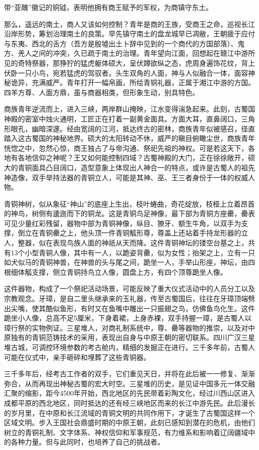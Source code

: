 带“亚醜”徽记的铜钺，表明他拥有商王赋予的军权，为商镇守东土。

那么，遥远的南土，商人又该如何控制？青年是商的王族，受商王之命，巡视长江沿岸形势，筹划治理南土的良策。早先镇守南土的盘龙城早已凋敝，王朝疲于应付与东夷、西北的舌方（吾方是殷墟出土卜辞中见到的一个商代的方国部落）、鬼方、羌人之间的冲突，久已疏于南土的治理。青年望向江面，回想起在赣江中游所见的奇特祭器，那狰狞的猛虎躯体硕大，呈伏蹲欲纵之态，虎周身遍饰花纹，背上伏卧一只小鸟，宛若猛虎的驾驭者。头生双角的人面，神与人似融合一体，面容神秘诡异，充满威严。青年打开一幅帛画，所绘青铜礼器，正属于湘江中游的方国。四羊方尊、人面方鼎，虽与商器相类，但形象生动，别具特色。

商族青年逆流而上，进入三峡，两岸群山掩映，江水变得湍急起来。此刻，古蜀国神殿的密室中烛火通明，工匠正在打着一副黄金面具。方面大耳，直鼻阔口，三角形眼孔，幽暗深邃。经由宽阔的江河，抵达终古的密林，商族青年似被感召，径直踏入这古蜀国的神秘地界。硕大的太阳转动不休，威严的瞋目俯瞰尘世，商族青年恍惚之中，忽然心惊，商王独占了与帝沟通、祭祀先祖的神权。可是若这天下，各地有各地信仰之神呢？王又如何能控制四域？古蜀神殿的大门，正在徐徐敞开，硕大的青铜面具凸目阔口，造型意象上体现出人神合一的特点，或许是古蜀人的祖先神造像，双手举持法器的青铜立人，可能是其神、巫、王三者身份于一体的权威人物。

青铜神树，似从象征“神山”的底座上生出，枝叶蜷曲，奇花绽放，枝桠上立着昂首的神鸟，树侧有逶迤而下的铜龙。这是青铜鸟足神像，最下部为青铜方座罍，罍表可见少量红彩残留，器物中部为青铜神像，纵目、獠牙、额生牛角，以双手为支撑，倒立在青铜罍之上，他头顶一件青铜觚形尊，尊盖上还站着手持龙形器的立人，整器，似在表现鸟族人面的神祇从天而降。这件青铜神坛的镂空台基之上，共有13个小型青铜人像，其中有一人，以跪姿背罍，似为女性；抬架之上，立有一只如犬似马的青铜神兽，在神兽的头与尾之间，跪坐一人，手举山形座，神坛，由四根细体觚支撑，侧立青铜持鸟立人像，圆盘上方，有四个顶尊跪坐人像。

这件器物，构成了一个祭祀活动场景，可能反映了重大仪式活动中的人员分工以及宗教观念。牙璋，是自二里头继承来的玉礼器，传至古蜀国后，往往在牙璋顶端劈出尖嘴，使其酷似鱼形，有时又在鱼嘴中雕出一只振翅之鸟，仿佛鱼鸟化生。这件跪坐小人像，总高不足5厘米，下身着裙，上身赤裸，双手持握一璋，是古蜀人以璋行祭的实物例证。三星堆人，对商礼制系统中，尊、罍等器物的推崇，以及对中原独有的青铜范铸技术的采用，表现出自身与中原王朝的密切联系。四川广汉三星堆古城，可调控环境参数的考古舱内，精细的发掘正在进行。三千多年前，古蜀人可能在仪式中，亲手砸碎和埋葬了这些青铜器。

三千多年后，经考古工作者的双手，它们重见天日，并将在此后被一一修复、渐渐弥合，从而再现出神秘古蜀的宏大时空。三星堆的历史，是见证中国多元一体交融汇聚的缩影，距今4500年开始，西北地区的先民带着彩陶文化，经过川西山区进入成都平原的西北地区，同时抵达的还有经三峡地区而来的长江中游先民。此后漫长的岁月里，在中原和长江流域的青铜文明的共同作用下，才诞生了古蜀国这样一个区域文明。步入王国社会鼎盛时期的中原王朝，此刻已感知到潜在的危机，由他们树立的青铜礼制、文字体系、神权信仰和军事规范，有力维系和影响着辽阔疆域中的各种力量。但与此同时，也培养了自己的挑战者。

